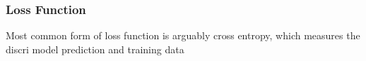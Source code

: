 \subsubsection{Loss Function}

Most common form of loss function is arguably cross entropy, which measures the discri model prediction and training data